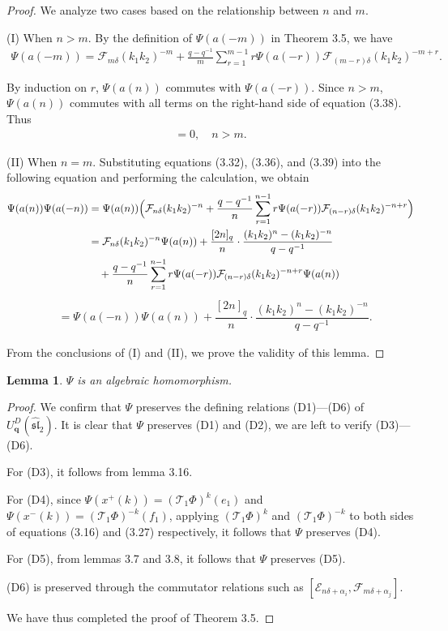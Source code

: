 \documentclass[12pt]{amsart}
\newtheorem{lemma}[theorem]{Lemma}
\numberwithin{equation}{section}
\numberwithin{equation}{section}
\begin{document}
\begin{proof}
We analyze two cases based on the relationship between \(n\) and \(m\).  

(I) When \(n > m\).  By the definition of \(\Psi(a(-m))\) in Theorem 3.5, we have  
\begin{align}
\Psi(a(-m)) = \mathcal{F}_{m\delta}(k_1k_2)^{-m} + \frac{q-q^{-1}}{m}\sum_{r=1}^{m-1}r\Psi(a(-r))\mathcal{F}_{(m-r)\delta}(k_1k_2)^{-m+r}.
\end{align}

By induction on \(r\),  
\(\Psi(a(n))\) commutes with \(\Psi(a(-r))\). Since \(n > m\), \(\Psi(a(n))\) commutes with all terms on the right-hand side of equation (3.38). 
Thus
\begin{align}
[\Psi(a(n)),\Psi(a(-m))]=0,\quad n>m.
\end{align}

(II) When \(n = m\).
Substituting equations (3.32), (3.36), and (3.39) into the following equation and performing the calculation, we obtain
\begin{align*}
\Psi(a(n))\Psi(a(-n))
&= \Psi(a(n))\Bigl(\mathcal{F}_{n\delta}(k_1k_2)^{-n} + \frac{q-q^{-1}}{n}\sum_{r=1}^{n-1}r\Psi(a(-r))\mathcal{F}_{(n-r)\delta}(k_1k_2)^{-n+r}\Bigr)
\\
&=\mathcal{F}_{n\delta}(k_1k_2)^{-n}\Psi(a(n)) +  \dfrac{[2n]_q}{n} \cdot \dfrac{(k_1k_2)^n - (k_1k_2)^{-n}}{q - q^{-1}}
\\
&\quad+\dfrac{q-q^{-1}}{n}\sum_{r=1}^{n-1}r\Psi(a(-r))\mathcal{F}_{(n-r)\delta}(k_1k_2)^{-n+r}\Psi(a(n))
\end{align*}
\begin{align*}
&=\Psi(a(-n))\Psi(a(n))+\dfrac{[2n]_q}{n} \cdot \dfrac{(k_1k_2)^n - (k_1k_2)^{-n}}{q - q^{-1}}.
\end{align*} 
 
From the conclusions of (I) and (II), we prove the validity of this lemma.
\end{proof}
\begin{lemma}
\(\Psi\) is an algebraic homomorphism.
\end{lemma}
\begin{proof}
We confirm that \(\Psi\) preserves the defining relations (D1)---(D6) of \(U_{\textbf{q}}^{D}(\widehat{\mathfrak{sl}}_{2})\). It is clear that  \(\Psi\) preserves (D1) and (D2), we are left to verify (D3)---(D6).

For (D3), it follows from lemma 3.16.

For (D4), since \(\Psi(x^{+}(k))=(\mathcal{T}_1\Phi)^k(e_1)\)
and \(\Psi(x^{-}(k))=(\mathcal{T}_1\Phi)^{-k}(f_1)\), applying \((\mathcal{T}_1\Phi)^k\)
and 
\((\mathcal{T}_1\Phi)^{-k}\)
to both sides of equations (3.16) and (3.27) respectively, it follows that \(\Psi\) preserves  (D4).

For (D5), from lemmas 3.7 and 3.8, it follows that \(\Psi\) preserves (D5).

(D6) is preserved through  the commutator relations such as \([\mathcal{E}_{n\delta+\alpha_i}, \mathcal{F}_{m\delta+\alpha_j}]\).

We have thus completed the proof of Theorem 3.5.
\end{proof}
\end{document}
